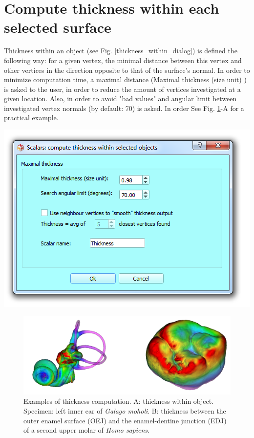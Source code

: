 \section{Compute thickness within each selected surface}
\begin{minipage}{0.5\textwidth}
Thickness within an object (see Fig. \ref{thickness_within_dialog}) is defined the following way: for a
given vertex, the minimal distance between this vertex and other
vertices in the direction opposite to that of the surface's normal. In order to minimize computation time, a maximal
distance (Maximal thickness (size unit) ) is asked to the user, in order
to reduce the amount of vertices investigated at a given location. Also, in order to avoid "bad values" and angular limit between investigated vertex normals (by default: 70\degree) is asked. In order See Fig. \ref{thickness_examples}-A for a practical example. 
 
\end{minipage}    
\begin{minipage}{0.5\textwidth}\centering
 \includegraphics[scale=0.5]{images/11/thickness_within_dialog}
\label{thickness_within_dialog}
 \end{minipage} 


\begin{figure}
  \centering
  \includegraphics[scale=0.28]{images/11/thickness_examples.png} 
	\caption{
Examples of thickness computation. A: thickness within object. Specimen: left inner ear of \textit{Galago moholi}. B: thickness between the outer enamel surface (OEJ) and the enamel-dentine junction (EDJ) of a second upper molar of \textit{Homo sapiens}.}
\label{thickness_examples}
 
\end{figure}





